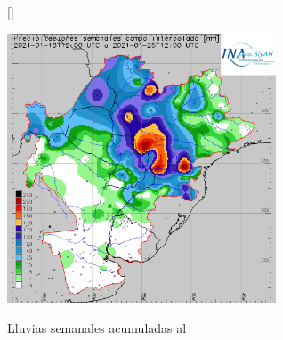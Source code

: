 \documentclass[11pt,spanish,a4paper] {article}
\DeclareRobustCommand{\fecha}{}
\DeclareRobustCommand{\fechaformat}{}
\DeclareRobustCommand{\textomapasemanal}{}
\begin{document}
\begin{figure}[H]
	[\FBwidth]
	{\caption{Lluvias semanales acumuladas al \fechaformat\\\hspace{\textwidth}\\\hspace{\textwidth}\textomapasemanal}\label{synopmap}}
	{\includegraphics[height=8cm]{synop_presente.png}}
\end{figure}
\end{document}
